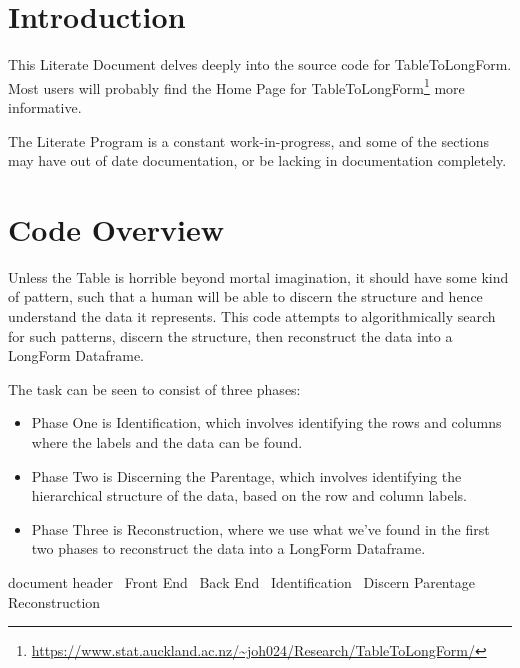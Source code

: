 \documentclass[a4paper]{article}
\begin{document}
\section{Introduction}
\label{sec:introduction}
This Literate Document delves deeply into the source code for
TableToLongForm. Most users will probably find the Home Page for
TableToLongForm\footnote{\url{https://www.stat.auckland.ac.nz/~joh024/Research/TableToLongForm/}}
more informative.

The Literate Program is a constant work-in-progress, and some of the
sections may have out of date documentation, or be lacking in
documentation completely.

\newpage
\section{Code Overview}
\label{sec:code.overview}
Unless the Table is horrible beyond mortal imagination, it should have
some kind of pattern, such that a human will be able to discern the
structure and hence understand the data it represents. This code
attempts to algorithmically search for such patterns, discern the
structure, then reconstruct the data into a LongForm Dataframe.

The task can be seen to consist of three phases:
\begin{itemize}
\item Phase One is Identification, which involves identifying the rows
  and columns where the labels and the data can be found.
\item Phase Two is Discerning the Parentage, which involves
  identifying the hierarchical structure of the data, based on the row
  and column labels.
\item Phase Three is Reconstruction, where we use what we've found in
  the first two phases to reconstruct the data into a LongForm
  Dataframe.
\end{itemize}
\endmoddef\let\nwnotused=\nwoutput{}
\LA{}document header~{\nwtagstyle{}}\RA{}
\LA{}Front End~{\nwtagstyle{}}\RA{}
\LA{}Back End~{\nwtagstyle{}}\RA{}
\LA{}Identification~{\nwtagstyle{}}\RA{}
\LA{}Discern Parentage~{\nwtagstyle{}}\RA{}
\LA{}Reconstruction~{\nwtagstyle{}}\RA{}
\nwnotused{TableToLongForm.R}\nwendcode{}\nwdocspar
\end{document}
